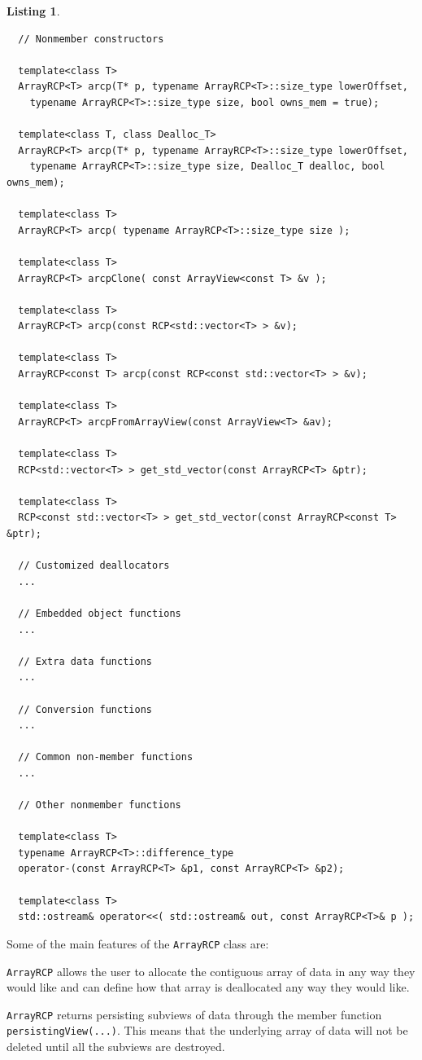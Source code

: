 \documentclass[pdf,ps2pdf,11pt]{SANDreport}
\newtheorem{listing}{Listing}
\begin{document}
\begin{listing}
{\begin{verbatim}
  // Nonmember constructors
  
  template<class T>
  ArrayRCP<T> arcp(T* p, typename ArrayRCP<T>::size_type lowerOffset,
    typename ArrayRCP<T>::size_type size, bool owns_mem = true);
  
  template<class T, class Dealloc_T>
  ArrayRCP<T> arcp(T* p, typename ArrayRCP<T>::size_type lowerOffset,
    typename ArrayRCP<T>::size_type size, Dealloc_T dealloc, bool owns_mem);
  
  template<class T>
  ArrayRCP<T> arcp( typename ArrayRCP<T>::size_type size );
  
  template<class T>
  ArrayRCP<T> arcpClone( const ArrayView<const T> &v );
  
  template<class T>
  ArrayRCP<T> arcp(const RCP<std::vector<T> > &v);
  
  template<class T>
  ArrayRCP<const T> arcp(const RCP<const std::vector<T> > &v);
  
  template<class T>
  ArrayRCP<T> arcpFromArrayView(const ArrayView<T> &av);
  
  template<class T>
  RCP<std::vector<T> > get_std_vector(const ArrayRCP<T> &ptr);
  
  template<class T>
  RCP<const std::vector<T> > get_std_vector(const ArrayRCP<const T> &ptr);

  // Customized deallocators
  ...

  // Embedded object functions
  ...

  // Extra data functions
  ...

  // Conversion functions
  ...

  // Common non-member functions
  ...

  // Other nonmember functions
  
  template<class T>
  typename ArrayRCP<T>::difference_type
  operator-(const ArrayRCP<T> &p1, const ArrayRCP<T> &p2);
  
  template<class T>
  std::ostream& operator<<( std::ostream& out, const ArrayRCP<T>& p );
\end{verbatim}}
\end{listing}

Some of the main features of the {}\texttt{ArrayRCP} class are:

{}\texttt{ArrayRCP} allows the user to allocate the contiguous array
of data in any way they would like and can define how that array is
deallocated any way they would like.

{}\texttt{ArrayRCP} returns persisting subviews of data through the
member function {}\texttt{persistingView(...)}.  This means that the
underlying array of data will not be deleted until all the subviews
are destroyed.
\end{document}
